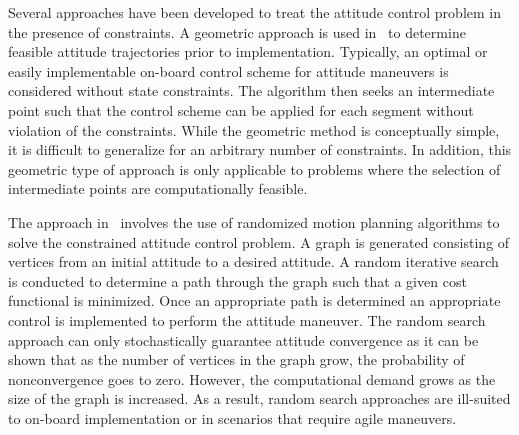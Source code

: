 \documentclass[letterpaper, 10 pt, conference]{ieeeconf}  %
\begin{document}
Several approaches have been developed to treat the attitude control problem in the presence of constraints.
A geometric approach is used in~\cite{hablani1999} to determine feasible attitude trajectories prior to implementation.
Typically, an optimal or easily implementable on-board control scheme for attitude maneuvers is considered without state constraints.
The algorithm then seeks an intermediate point such that the control scheme can be applied for each segment without violation of the constraints.
While the geometric method is conceptually simple, it is difficult to generalize for an arbitrary number of constraints.
In addition, this geometric type of approach is only applicable to problems where the selection of intermediate points are computationally feasible.

The approach in~\cite{frazzoli2001} involves the use of randomized motion planning algorithms to solve the constrained attitude control problem.
A graph is generated consisting of vertices from an initial attitude to a desired attitude. 
A random iterative search is conducted to determine a path through the graph such that a given cost functional is minimized.
Once an appropriate path is determined an appropriate control is implemented to perform the attitude maneuver.
The random search approach can only stochastically guarantee attitude convergence as it can be shown that as the number of vertices in the graph grow, the probability of nonconvergence goes to zero.
However, the computational demand grows as the size of the graph is increased. 
As a result, random search approaches are ill-suited to on-board implementation or in scenarios that require agile maneuvers.

\end{document}
